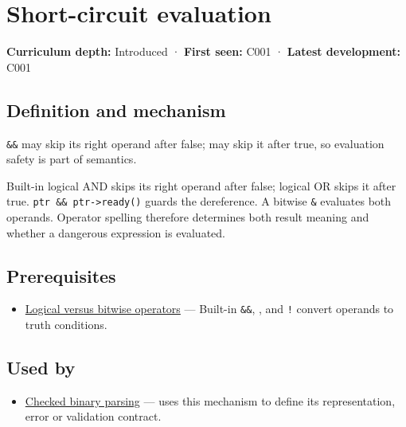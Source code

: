 \hypertarget{appendix-2e245a6fa8d3}{}\label{referencestart:appendix-2e245a6fa8d3}
\section{Short-circuit evaluation}\label{appendix-2e245a6fa8d3-short-circuit-evaluation}

\textbf{Curriculum depth:} Introduced · \textbf{First seen:} C001 · \textbf{Latest development:} C001

\subsection{Definition and mechanism}\label{appendix-2e245a6fa8d3-definition-and-mechanism}

\texttt{\&\&} may skip its right operand after false; \texttt{\textbar{}\textbar{}} may skip it after true, so evaluation safety is part of semantics.

Built-in logical AND skips its right operand after false; logical OR skips it after true. \texttt{ptr\ \&\&\ ptr-\textgreater{}ready()} guards the dereference. A bitwise \texttt{\&} evaluates both operands. Operator spelling therefore determines both result meaning and whether a dangerous expression is evaluated.

\subsection{Prerequisites}\label{appendix-2e245a6fa8d3-prerequisites}

\begin{itemize}
\tightlist
\item
  \hyperref[appendix-fe6b457d68d8]{Logical versus bitwise operators} --- Built-in \texttt{\&\&}, \texttt{\textbar{}\textbar{}}, and \texttt{!} convert operands to truth conditions.
\end{itemize}

\subsection{Used by}\label{appendix-2e245a6fa8d3-used-by}

\begin{itemize}
\tightlist
\item
  \hyperref[appendix-652d81568de9]{Checked binary parsing} --- uses this mechanism to define its representation, error or validation contract.
\end{itemize}

